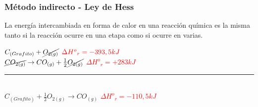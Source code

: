     \subsubsection{Método indirecto - Ley de Hess}
        \sangria{} La energía intercambiada en forma de calor en una reacción química es la misma tanto si la reacción ocurre en una etapa como si ocurre en varias.
        \begin{center}
            $C_{(Grafito)} + \cancel{O_{2(g)}}$ \hspace{25pt} $\textcolor{red}{\Delta {H^o}_{r} = - 393,5 kJ}$\\[5pt]
            $\cancel{CO_{2(g)}} \rightarrow CO_{(g)} + \frac{1}{2} \cancel{O_{2(g)}}$ \hspace{25pt} \textcolor{red}{$\Delta {H^o}_{r} = + 283 kJ$}\\[5pt]
            \rule{8cm}{0.05mm} \\[5pt]
            $C_{(Grafito)} + \frac{1}{2} O_{2(g)} \rightarrow CO_{(g)}$ \hspace{20pt} \textcolor{red}{$\Delta {H^o}_{r} = -110,5 kJ$}
        \end{center}
